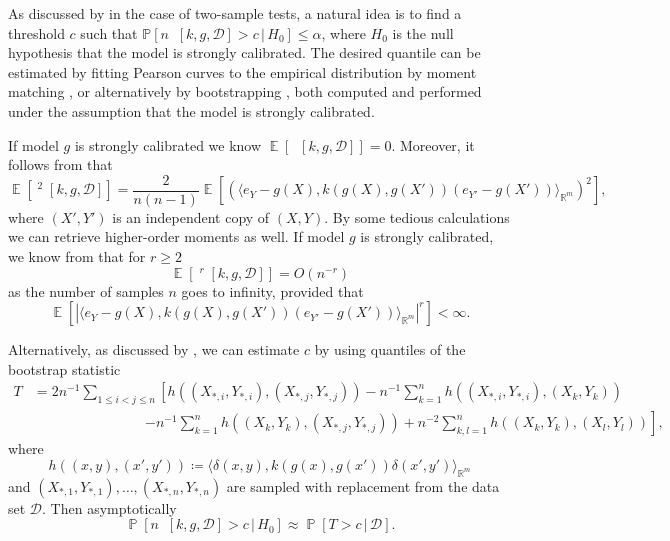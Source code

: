 \documentclass{article}
\DeclareMathOperator{\Prob}{\mathbb{P}}
\DeclareMathOperator{\Expect}{\mathbb{E}}
\DeclareMathOperator{\unbiasedestimator}{\widehat{SKCE}_{uq}}
\newcommand{\nullhypothesis}{H_0}
\newcommand{\given}{\,|\,}
\begin{document}
As discussed by \citet{gretton12_kernel_two_sampl_test} in the case of two-sample
tests, a natural idea is to find a threshold $c$ such that
$\mathbb{P}[n \unbiasedestimator[k, g, \mathcal{D}] > c \given \nullhypothesis] \leq \alpha$,
where $\nullhypothesis$ is the null hypothesis that the model is strongly
calibrated. The desired quantile can be estimated by fitting Pearson curves to
the empirical distribution by moment matching
\citep{gretton12_kernel_two_sampl_test}, or alternatively by
bootstrapping \citep{arcones92_boots_u_v_statis}, both computed and performed
under the assumption that the model is strongly calibrated.

If model $g$ is strongly calibrated we know
$\Expect[\unbiasedestimator[k, g, \mathcal{D}]] = 0$. Moreover, it follows from
\citet[p.~299][]{hoeffding48_class_statis_with_asymp_normal_distr} that
\begin{equation*}
  \Expect\left[\unbiasedestimator^2[k, g, \mathcal{D}]\right] = \frac{2}{n(n-1)} \Expect\left[{\left(\langle e_Y - g(X), k(g(X),g(X')) (e_{Y'} - g(X')) \rangle_{\mathbb{R}^m}\right)}^2\right],
\end{equation*}
where $(X',Y')$ is an independent copy of $(X,Y)$. By some tedious calculations
we can retrieve higher-order moments as well. If model $g$ is strongly
calibrated, we know from
\citet[Lemma~B, Section~5.2.2]{serfling80_approx_theor_mathem_statis} that for
$r \geq 2$
\begin{equation*}
  \Expect\left[\unbiasedestimator^r[k, g, \mathcal{D}]\right] = O(n^{-r})
\end{equation*}
as the number of samples $n$ goes to infinity, provided that
\begin{equation*}
  \Expect\left[{\left|\langle e_Y - g(X), k(g(X),g(X')) (e_{Y'} - g(X')) \rangle_{\mathbb{R}^m}\right|}^r\right] < \infty.
\end{equation*}

Alternatively, as discussed by \citet[Section~5][]{arcones92_boots_u_v_statis},
we can estimate $c$ by using quantiles of the bootstrap statistic
\begin{equation*}
  \begin{split}
    T &= 2 n^{-1} \sum_{1 \leq i < j \leq n} \left[ h((X_{*,i},Y_{*,i}), (X_{*,j},Y_{*,j})) - n^{-1} \sum_{k=1}^n h((X_{*,i},Y_{*,i}),(X_k,Y_k)) \right. \\
    &\qquad \qquad \qquad \qquad \left. - n^{-1} \sum_{k=1}^n h((X_k,Y_k),(X_{*,j},Y_{*,j})) + n^{-2} \sum_{k,l=1}^n h((X_k,Y_k),(X_l,Y_l))\right],
  \end{split}
\end{equation*}
where
\begin{equation*}
  h((x,y),(x',y')) \coloneqq \langle \delta(x,y), k(g(x),g(x')) \delta(x',y') \rangle_{\mathbb{R}^m}
\end{equation*}
and $(X_{*,1},Y_{*,1}),\ldots,(X_{*,n},Y_{*,n})$ are sampled with replacement
from the data set $\mathcal{D}$. Then asymptotically
\begin{equation*}
  \Prob\left[n \unbiasedestimator[k, g, \mathcal{D}] > c \given \nullhypothesis \right] \approx \Prob[T > c \given \mathcal{D}].
\end{equation*}
\end{document}
